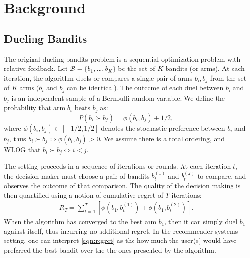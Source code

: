 
\section{Background}

\subsection{Dueling Bandits}
\label{sec:db}
The original dueling bandits problem is a sequential optimization problem with relative feedback. 
Let $\mathcal{B} = \{b_1,\ldots,b_K\}$ be the set of $K$ bandits (or arms). At each iteration, the algorithm duels or compares a single pair of arms $b_i, b_j$ from the set of $K$ arms ($b_i$ and $b_j$ can be identical). The outcome of each duel between $b_i$ and $b_j$ is an independent sample of a Bernoulli random variable. We define the probability that arm $b_i$ beats $b_j$ as: $$P(b_i \succ b_j) = \phi(b_i,b_j) + 1/2,$$
where $\phi(b_i,b_j)\in [-1/2,1/2]$ denotes the stochastic preference between $b_i$ and $b_j$, thus $b_i \succ b_j \Leftrightarrow \phi(b_i,b_j) > 0$.
We assume there is a total ordering, and WLOG that $b_i \succ b_j \Leftrightarrow i < j$.

The setting proceeds in a sequence of iterations or rounds. At each iteration $t$, the decision maker must choose a pair of bandits $b_t^{(1)}$ and $b_t^{(2)}$ to compare, and observes the outcome of that comparison. The quality of the decision making is then quantified using a notion of cumulative regret of $T$ iterations:
\begin{eqnarray}
R_T = \sum_{t=1}^T \left[ \phi(b_1,b_t^{(1)}) + \phi(b_1, b_t^{(2)})\right].\label{eqn:regret}
\end{eqnarray}
When the algorithm has converged to the best arm $b_1$, then it can simply duel $b_1$ against itself, thus incurring no additional regret.
In the recommender systems setting, one can interpret \eqref{eqn:regret} as the how much the user(s) would have preferred the best bandit over the the ones presented by the algorithm.  



